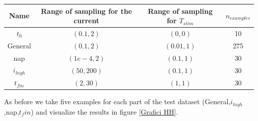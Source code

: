 \documentclass{article}
\begin{document}
\begin{center}
    \begin{tabular}{cccc}
        \hline
        Name       & Range of sampling for the current & Range of sampling for $T_{stim}$ & $n_{examples}$ \\
        \hline\hline
        $t_0$      & $(0.1,2)$                         & $(0,0)$                          & 10             \\
        General    & $(0.1,2)$                         & $(0.01,1)$                       & 275            \\
        nap        & $(1e-4,2)$                        & $(0.1,1)$                        & 30             \\
        $i_{high}$ & $(50,200)$                        & $(0.1,1)$                        & 30             \\
        $t_{fin}$  & $(2,30)$                          & $(1,1)$                          & 30             \\
        \hline
    \end{tabular}
\end{center}
As before we take five examples for each part of the test dataset (General,$i_{high}$,nap,$t_fin$) and visualize the results in figure \ref{Grafici HH}.
\end{document}
